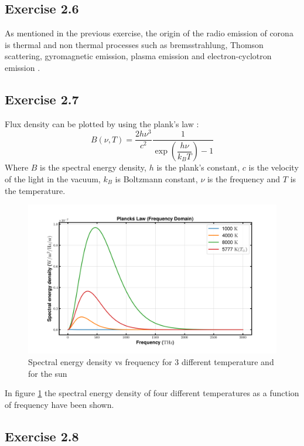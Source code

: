 \documentclass[12pt]{article}
\begin{document}
 \subsection{Exercise 2.6}

 As mentioned in the previous exercise, the origin of the radio emission of corona is thermal and non thermal processes such as bremsstrahlung, Thomson scattering, gyromagnetic emission, plasma emission and electron-cyclotron emission \parencite{Thesun}.

 \subsection{Exercise 2.7}

 Flux density can be plotted by using the plank's law \parencite{Planklaw}:
 \begin{equation}
 \label{2.4}
 B(\nu,T) = \dfrac{2h\nu^3}{c^2} \dfrac{1}{\exp(\dfrac{h\nu}{k_BT}) -1} 
 \end{equation}
 Where $B$ is the spectral energy density, $h$ is the plank's constant, $c$ is the velocity of the light in the vacuum, $k_B$ is Boltzmann constant, $\nu$ is the frequency and $T$ is the temperature. 

 \begin{figure}[H]
 \centering
 \includegraphics[scale=.5]{fig/Plank_law.png}
 \caption{Spectral energy density vs frequency for 3 different temperature and for the sun}
 \label{fig2.2}
 \end{figure}

 In figure \ref{fig2.2} the spectral energy density of four different temperatures as a function of frequency have been shown.

 \subsection{Exercise 2.8}
\end{document}
